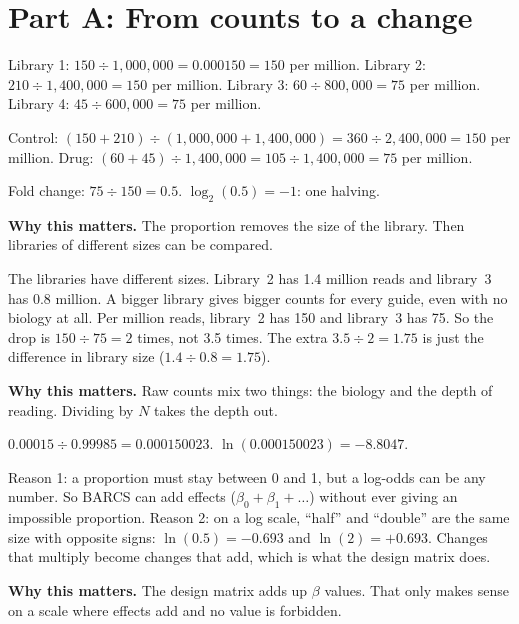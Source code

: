 \documentclass[12pt]{article}
\newcommand{\why}[1]{\par\smallskip\noindent\textcolor{barcsgreen!70!black}{\textbf{Why this matters.}} #1}
\begin{document}
\section*{Part A: From counts to a change}
\begin{exlist}
\item
\begin{parts}
\item Library 1: $150 \div 1{,}000{,}000 = 0.000150 = 150$ per million.
  Library 2: $210 \div 1{,}400{,}000 = 150$ per million. Library 3:
  $60 \div 800{,}000 = 75$ per million. Library 4: $45 \div 600{,}000 = 75$
  per million.
\item Control: $(150 + 210) \div (1{,}000{,}000 + 1{,}400{,}000) = 360 \div
  2{,}400{,}000 = 150$ per million. Drug: $(60 + 45) \div 1{,}400{,}000 =
  105 \div 1{,}400{,}000 = 75$ per million.
\item Fold change: $75 \div 150 = 0.5$. $\log_2(0.5) = -1$: one halving.
\end{parts}
\why{The proportion removes the size of the library. Then libraries of
different sizes can be compared.}

\item The libraries have different sizes. Library~2 has 1.4 million reads
and library~3 has 0.8 million. A bigger library gives bigger counts for
every guide, even with no biology at all. Per million reads, library~2 has
150 and library~3 has 75. So the drop is $150 \div 75 = 2$ times, not 3.5
times. The extra $3.5 \div 2 = 1.75$ is just the difference in library size
($1.4 \div 0.8 = 1.75$).
\why{Raw counts mix two things: the biology and the depth of reading.
Dividing by $N$ takes the depth out.}

\item
\begin{parts}
\item $0.00015 \div 0.99985 = 0.000150023$. $\ln(0.000150023) = -8.8047$.
\item Reason 1: a proportion must stay between 0 and 1, but a log-odds can be
  any number. So BARCS can add effects ($\beta_0 + \beta_1 + \dots$) without
  ever giving an impossible proportion. Reason 2: on a log scale, ``half''
  and ``double'' are the same size with opposite signs:
  $\ln(0.5) = -0.693$ and $\ln(2) = +0.693$. Changes that multiply become
  changes that add, which is what the design matrix does.
\end{parts}
\why{The design matrix adds up $\beta$ values. That only makes sense on a
scale where effects add and no value is forbidden.}
\end{exlist}
\end{document}
